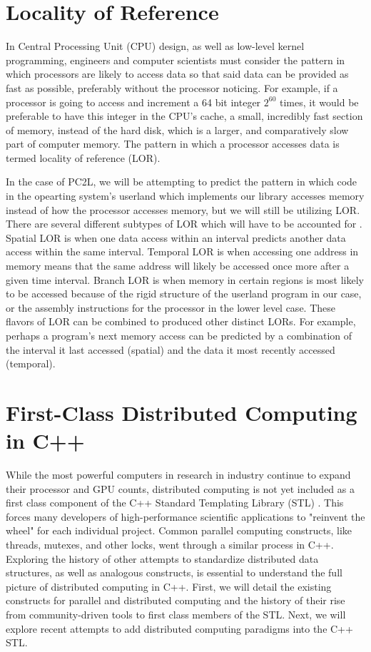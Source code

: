\section{Locality of Reference}
In Central Processing Unit (CPU) design, as well as low-level kernel programming, engineers and computer scientists must consider the pattern in which processors are likely to access data so that said data can be provided as fast as possible, preferably without the processor noticing. For example, if a processor is going to access and increment a 64 bit integer $2^{60}$ times, it would be preferable to have this integer in the CPU's cache, a small, incredibly fast section of memory, instead of the hard disk, which is a larger, and comparatively slow part of computer memory. The pattern in which a processor accesses data is termed locality of reference (LOR).

In the case of PC2L, we will be attempting to predict the pattern in which code in the opearting system's userland which implements our library accesses memory instead of how the processor accesses memory, but we will still be utilizing LOR. There are several different subtypes of LOR which will have to be accounted for \cite{Stallings_2010}. Spatial LOR is when one data access within an interval predicts another data access within the same interval. Temporal LOR is when accessing one address in memory means that the same address will likely be accessed once more after a given time interval. Branch LOR is when memory in certain regions is most likely to be accessed because of the rigid structure of the userland program in our case, or the assembly instructions for the processor in the lower level case. These flavors of LOR can be combined to produced other distinct LORs. For example, perhaps a program's next memory access can be predicted by a combination of the interval it last accessed (spatial) and the data it most recently accessed (temporal). 

\section{First-Class Distributed Computing in C++} \label{first_class_dist_cpp}
While the most powerful computers in research in industry continue to expand their processor and GPU counts,
distributed computing is not yet included as a first class component of the C++ Standard Templating Library (STL) \cite{towards_dist_cpp}. This forces many developers of high-performance scientific applications to "reinvent the wheel" for each individual project.  Common parallel computing constructs, like threads, mutexes, and other locks, went through a similar process in C++. Exploring the history of other attempts to standardize distributed data structures, as well as analogous constructs, is essential to understand the full picture of distributed computing in C++. First, we will detail the existing constructs for parallel and distributed computing and the history of their rise from community-driven tools to first class members of the STL. Next, we will explore recent attempts to add distributed computing paradigms into the C++ STL. 


